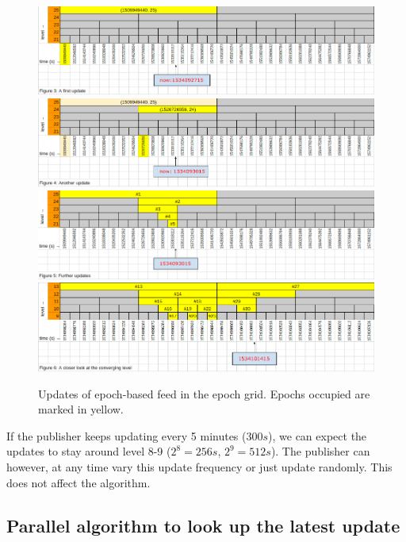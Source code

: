 \begin{figure}[htbp]
\centering
\includegraphics[width=\textwidth]{fig/feeds/00.png}\\
\includegraphics[width=\textwidth]{fig/feeds/01.png}\\
\includegraphics[width=\textwidth]{fig/feeds/02.png}\\
\includegraphics[width=\textwidth]{fig/feeds/03.png}
\caption[Updates of epoch-based feed in the epoch grid]{Updates of epoch-based feed in the epoch grid. Epochs occupied are marked in yellow. }
\label{fig:feeds-update}
\end{figure}

If the publisher keeps updating every 5 minutes ($300s$), we can expect the updates to stay around level 8-9 ($2^8 = 256s$, $2^9 = 512s$). The publisher can however, at any time vary this update frequency or just update randomly. This does not affect the algorithm.

\subsection*{Parallel algorithm to look up the latest update \statusorange}\label{sec:feeds-lookup-algo}

